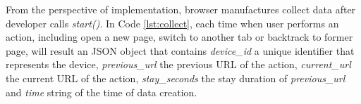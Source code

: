 From the perspective of implementation, browser manufactures collect data after developer
calls \emph{start()}.
In Code \ref{lst:collect}, each time when user performs an action, including open a new page,
switch to another tab or backtrack to former page, will result an JSON object that contains
\emph{device\_id} a unique identifier that represents the device, \emph{previous\_url} the previous
URL of the action, \emph{current\_url} the current URL of the action, \emph{stay\_seconds}
the stay duration of \emph{previous\_url} and \emph{time} string of the time of data creation.


\cleardoublepage